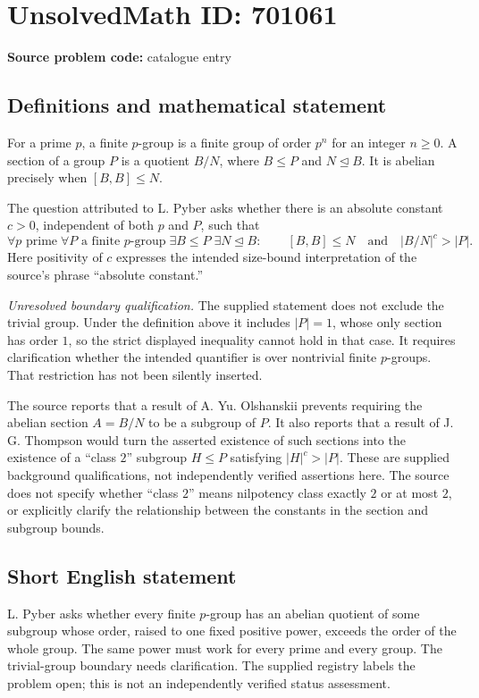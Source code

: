 \documentclass[11pt]{article}
\begin{document}
\section*{UnsolvedMath ID: 701061}
\textbf{Source problem code:} catalogue entry
\subsection{Definitions and mathematical statement}
For a prime \(p\), a finite \(p\)-group is a finite group of order \(p^n\) for an integer \(n\geq 0\). A section of a group \(P\) is a quotient \(B/N\), where \(B\leq P\) and \(N\trianglelefteq B\). It is abelian precisely when \([B,B]\leq N\).

The question attributed to L. Pyber asks whether there is an absolute constant \(c>0\), independent of both \(p\) and \(P\), such that
\[
\forall p\text{ prime}\;\forall P\text{ a finite }p\text{-group}\;\exists B\leq P\;\exists N\trianglelefteq B:
\qquad [B,B]\leq N\quad\text{and}\quad |B/N|^c>|P|.
\]
Here positivity of \(c\) expresses the intended size-bound interpretation of the source's phrase ``absolute constant.''

\textit{Unresolved boundary qualification.} The supplied statement does not exclude the trivial group. Under the definition above it includes \(|P|=1\), whose only section has order \(1\), so the strict displayed inequality cannot hold in that case. It requires clarification whether the intended quantifier is over nontrivial finite \(p\)-groups. That restriction has not been silently inserted.

The source reports that a result of A. Yu. Olshanskii prevents requiring the abelian section \(A=B/N\) to be a subgroup of \(P\). It also reports that a result of J. G. Thompson would turn the asserted existence of such sections into the existence of a ``class \(2\)'' subgroup \(H\leq P\) satisfying \(|H|^c>|P|\). These are supplied background qualifications, not independently verified assertions here. The source does not specify whether ``class \(2\)'' means nilpotency class exactly \(2\) or at most \(2\), or explicitly clarify the relationship between the constants in the section and subgroup bounds.
\subsection{Short English statement}
L. Pyber asks whether every finite \(p\)-group has an abelian quotient of some subgroup whose order, raised to one fixed positive power, exceeds the order of the whole group. The same power must work for every prime and every group. The trivial-group boundary needs clarification. The supplied registry labels the problem open; this is not an independently verified status assessment.
\end{document}
